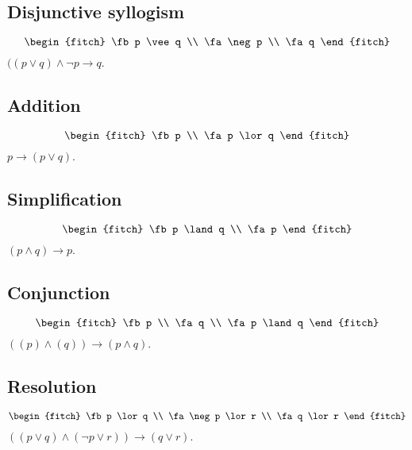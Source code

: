 \subsection{Disjunctive syllogism}
\begin{equation*}
  \begin{fitch}
    \fb p \vee q \\
    \fa \neg p \\
    \fa q
  \end{fitch}
\end{equation*}
$( (p \lor q ) \land \neg p \to q$.

\subsection{Addition}
\begin{equation*}
  \begin{fitch}
    \fb p \\
    \fa p \lor q
  \end{fitch}
\end{equation*}
$ p \to (p \lor q)$.

\subsection{Simplification}
\begin{equation*}
  \begin{fitch}
    \fb p \land q \\
    \fa p
  \end{fitch}
\end{equation*}
$(p \land q) \to p$.

\subsection{Conjunction}
\begin{equation*}
  \begin{fitch}
    \fb p \\
    \fa q \\
    \fa p \land q
  \end{fitch}
\end{equation*}
$( (p) \land (q)) \to (p \land q)$.

\subsection{Resolution}
\begin{equation*}
  \begin{fitch}
    \fb p \lor q \\
    \fa \neg p \lor r \\
    \fa q \lor r
  \end{fitch}
\end{equation*}
$ ( (p \lor q) \land (\neg p \lor r ) ) \to (q \lor r)$.



